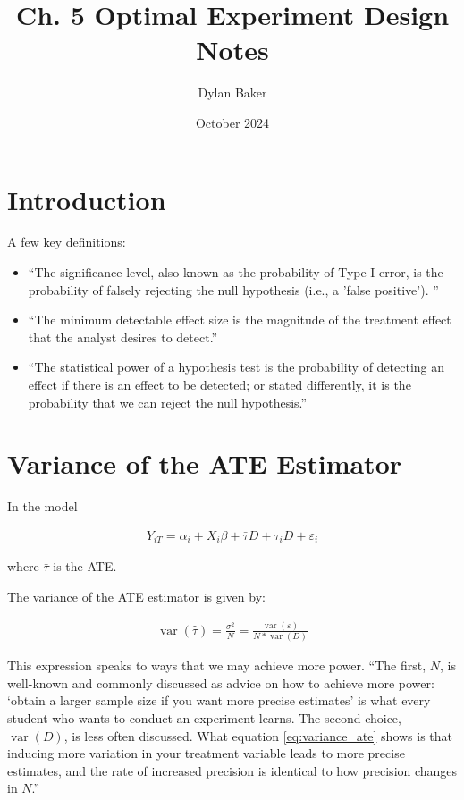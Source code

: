 \documentclass[10pt]{article}
\title{Ch. 5 Optimal Experiment Design Notes}
\author{Dylan Baker}
\date{October 2024}
\begin{document}
\maketitle

\newpage

\section{Introduction}

A few key definitions:

\begin{itemize}
    \item ``The significance level, also known as the probability of Type I error, is the probability of falsely rejecting the null hypothesis (i.e., a 'false positive'). ''
    \item ``The minimum detectable effect size is the magnitude of the treatment effect that the analyst desires to detect.'' 
    \item ``The statistical power of a hypothesis test is the probability of detecting an effect if there is an effect to be detected; or stated differently, it is the probability that we can reject the null hypothesis.''
\end{itemize}

\section{Variance of the ATE Estimator}

In the model

\begin{align}
    Y_{i T}=\alpha_i+X_i \beta+\bar{\tau} D+\tau_i D+\varepsilon_i
\end{align}

where $\bar{\tau}$ is the ATE.

The variance of the ATE estimator is given by:

\begin{align}
    \operatorname{var}(\hat{\tau})=\frac{\sigma^2}{N}=\frac{\operatorname{var}(\varepsilon)}{N * \operatorname{var}(D)} \label{eq:variance_ate}
\end{align}

This expression speaks to ways that we may achieve more power. 
``The first, $N$, is well-known and commonly discussed as advice 
on how to achieve more power: `obtain a larger sample size if you 
want more precise estimates' is what every student who wants 
to conduct an experiment learns. The second choice, 
$\operatorname{var}(D)$, is less often discussed. What 
equation \eqref{eq:variance_ate} shows is that inducing more variation in 
your treatment variable leads to more precise estimates, and 
the rate of increased precision is identical to how precision changes in $N$.''
\end{document}
